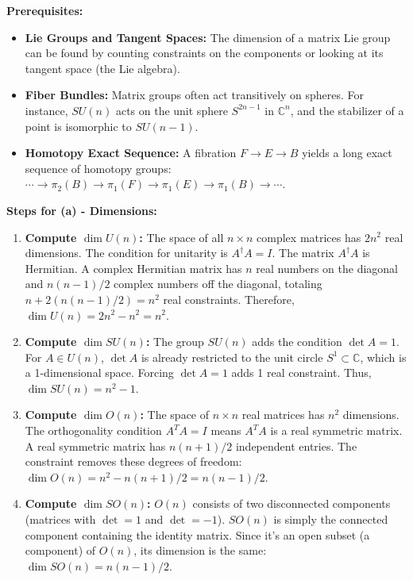 \begin{solution}
\textbf{Prerequisites:}
\begin{itemize}
    \item \textbf{Lie Groups and Tangent Spaces:} The dimension of a matrix Lie group can be found by counting constraints on the components or looking at its tangent space (the Lie algebra).
    \item \textbf{Fiber Bundles:} Matrix groups often act transitively on spheres. For instance, $SU(n)$ acts on the unit sphere $S^{2n-1}$ in $\mathbb{C}^n$, and the stabilizer of a point is isomorphic to $SU(n-1)$.
    \item \textbf{Homotopy Exact Sequence:} A fibration $F \to E \to B$ yields a long exact sequence of homotopy groups: $\cdots \to \pi_2(B) \to \pi_1(F) \to \pi_1(E) \to \pi_1(B) \to \cdots$.
\end{itemize}

\medskip
\textbf{Steps for (a) - Dimensions:}
\begin{enumerate}
    \item \textbf{Compute $\dim U(n)$:} The space of all $n \times n$ complex matrices has $2n^2$ real dimensions. The condition for unitarity is $A^\dagger A = I$. The matrix $A^\dagger A$ is Hermitian. A complex Hermitian matrix has $n$ real numbers on the diagonal and $n(n-1)/2$ complex numbers off the diagonal, totaling $n + 2(n(n-1)/2) = n^2$ real constraints. Therefore, $\dim U(n) = 2n^2 - n^2 = n^2$.
    \item \textbf{Compute $\dim SU(n)$:} The group $SU(n)$ adds the condition $\det A = 1$. For $A \in U(n)$, $\det A$ is already restricted to the unit circle $S^1 \subset \mathbb{C}$, which is a 1-dimensional space. Forcing $\det A = 1$ adds 1 real constraint. Thus, $\dim SU(n) = n^2 - 1$.
    \item \textbf{Compute $\dim O(n)$:} The space of $n \times n$ real matrices has $n^2$ dimensions. The orthogonality condition $A^T A = I$ means $A^T A$ is a real symmetric matrix. A real symmetric matrix has $n(n+1)/2$ independent entries. The constraint removes these degrees of freedom: $\dim O(n) = n^2 - n(n+1)/2 = n(n-1)/2$.
    \item \textbf{Compute $\dim SO(n)$:} $O(n)$ consists of two disconnected components (matrices with $\det = 1$ and $\det = -1$). $SO(n)$ is simply the connected component containing the identity matrix. Since it's an open subset (a component) of $O(n)$, its dimension is the same: $\dim SO(n) = n(n-1)/2$.
\end{enumerate}


\end{solution}
